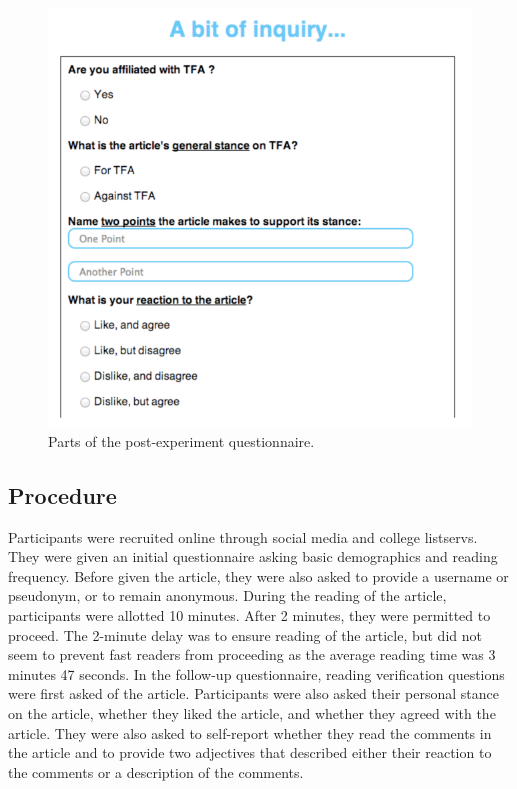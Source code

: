 \begin{figure}[h]
\centering
\includegraphics[scale=0.23]{questionnaire.png} 
\caption{Parts of the post-experiment questionnaire.}
\label{fig:questionnaire}
\end{figure}

\subsection{Procedure}
Participants were recruited online through social media and college listservs. They were given an initial questionnaire asking basic demographics and reading frequency. Before given the article, they were also asked to provide a username or pseudonym, or to remain anonymous. During the reading of the article, participants were allotted 10 minutes. After 2 minutes, they were permitted to proceed. The 2-minute delay was to ensure reading of the article, but did not seem to prevent fast readers from proceeding as the average reading time was 3 minutes 47 seconds. In the follow-up questionnaire, reading verification questions were first asked of the article. Participants were also asked their personal stance on the article, whether they liked the article, and whether they agreed with the article. They were also asked to self-report whether they read the comments in the article and to provide two adjectives that described either their reaction to the comments or a description of the comments.

